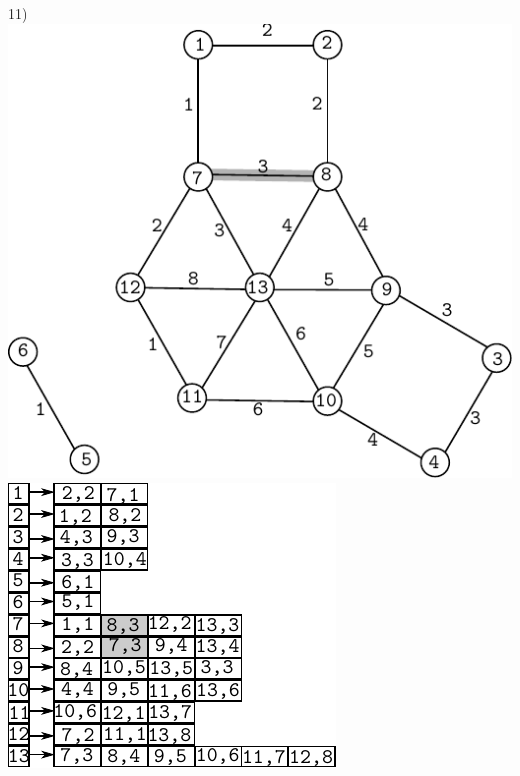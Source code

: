 \documentclass{article}
\begin{document}
\begin{center}
11)\includegraphics[scale=0.6]{bottleneck/g11}
\hspace{5mm}
\includegraphics[scale=0.9]{bottleneck/l11}
\end{center}
\end{document}
